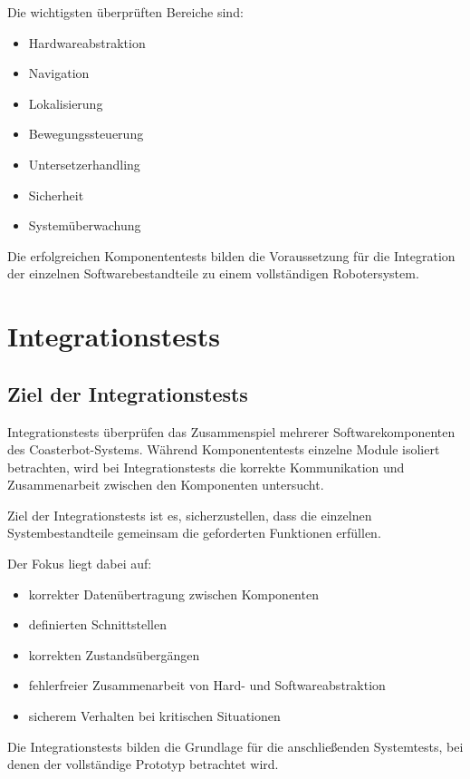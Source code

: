Die wichtigsten überprüften Bereiche sind:

\begin{itemize}
\tightlist
\item
  Hardwareabstraktion
\item
  Navigation
\item
  Lokalisierung
\item
  Bewegungssteuerung
\item
  Untersetzerhandling
\item
  Sicherheit
\item
  Systemüberwachung
\end{itemize}

Die erfolgreichen Komponententests bilden die Voraussetzung für die
Integration der einzelnen Softwarebestandteile zu einem vollständigen
Robotersystem.

\section{Integrationstests}\label{integrationstests-1}

\subsection{Ziel der
Integrationstests}\label{ziel-der-integrationstests}

Integrationstests überprüfen das Zusammenspiel mehrerer
Softwarekomponenten des Coasterbot-Systems. Während Komponententests
einzelne Module isoliert betrachten, wird bei Integrationstests die
korrekte Kommunikation und Zusammenarbeit zwischen den Komponenten
untersucht.

Ziel der Integrationstests ist es, sicherzustellen, dass die einzelnen
Systembestandteile gemeinsam die geforderten Funktionen erfüllen.

Der Fokus liegt dabei auf:

\begin{itemize}
\tightlist
\item
  korrekter Datenübertragung zwischen Komponenten
\item
  definierten Schnittstellen
\item
  korrekten Zustandsübergängen
\item
  fehlerfreier Zusammenarbeit von Hard- und Softwareabstraktion
\item
  sicherem Verhalten bei kritischen Situationen
\end{itemize}

Die Integrationstests bilden die Grundlage für die anschließenden
Systemtests, bei denen der vollständige Prototyp betrachtet wird.

